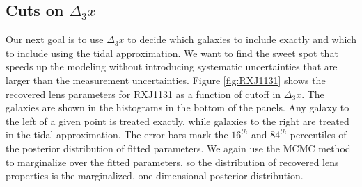 \subsection{Cuts on $\Delta_3 x$}
Our next goal is to use $\Delta_3x$ to decide which galaxies to include exactly and which to include using the tidal approximation. We want to find the sweet spot that speeds up the modeling without introducing systematic uncertainties that are larger than the measurement uncertainties.
Figure \ref{fig:RXJ1131} shows the recovered lens parameters for RXJ1131 as a function of cutoff in $\Delta_3x$. The galaxies are shown in the histograms in the bottom of the panels. Any galaxy to the left of a given point is treated exactly, while galaxies to the right are treated in the tidal approximation. The error bars mark the $16^{th}$ and $84^{th}$ percentiles of the posterior distribution of fitted parameters. We again use the MCMC method to marginalize over the fitted parameters, so the distribution of recovered lens properties is the marginalized, one dimensional posterior distribution.
  